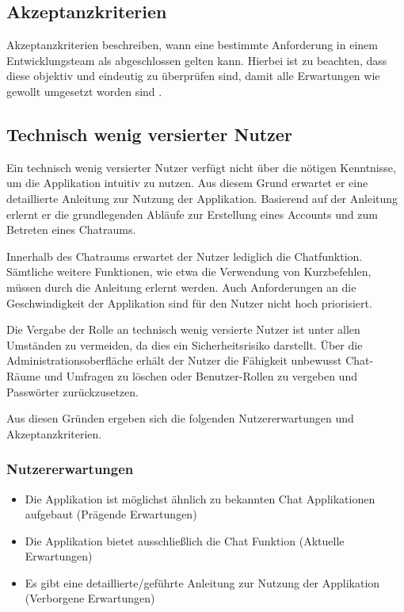 \subsection{Akzeptanzkriterien}
Akzeptanzkriterien beschreiben, wann eine bestimmte Anforderung in einem Entwicklungsteam als abgeschlossen gelten kann.
Hierbei ist zu beachten, dass diese objektiv und eindeutig zu überprüfen sind, damit alle Erwartungen wie gewollt umgesetzt worden sind \autocite{noauthor_akzeptanzkriterien_nodate}.

\subsection{Technisch wenig versierter Nutzer}
Ein technisch wenig versierter Nutzer verfügt nicht über die nötigen Kenntnisse, um die Applikation intuitiv zu nutzen.
Aus diesem Grund erwartet er eine detaillierte Anleitung zur Nutzung der Applikation.
Basierend auf der Anleitung erlernt er die grundlegenden Abläufe zur Erstellung eines Accounts und zum Betreten eines Chatraums.

\noindent{}Innerhalb des Chatraums erwartet der Nutzer lediglich die Chatfunktion.
Sämtliche weitere Funktionen, wie etwa die Verwendung von Kurzbefehlen, müssen durch die Anleitung erlernt werden.
Auch Anforderungen an die Geschwindigkeit der Applikation sind für den Nutzer nicht hoch priorisiert.

\noindent{}Die Vergabe der  Rolle an technisch wenig versierte Nutzer ist unter allen Umständen zu vermeiden, da dies ein Sicherheitsrisiko darstellt.
Über die Administrationsoberfläche erhält der Nutzer die Fähigkeit unbewusst Chat-Räume und Umfragen zu löschen oder Benutzer-Rollen zu vergeben und Passwörter zurückzusetzen.

\noindent{}Aus diesen Gründen ergeben sich die folgenden Nutzererwartungen und Akzeptanzkriterien.

\subsubsection{Nutzererwartungen}
\begin{itemize}
  \item Die Applikation ist möglichst ähnlich zu bekannten Chat Applikationen aufgebaut (Prägende Erwartungen)
  \item Die Applikation bietet ausschließlich die Chat Funktion (Aktuelle Erwartungen)
  \item Es gibt eine detaillierte/geführte Anleitung zur Nutzung der Applikation (Verborgene Erwartungen)
\end{itemize}

